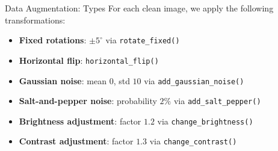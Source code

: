 \begin{frame}{Data Augmentation: Types}
  For each clean image, we apply the following transformations:
  \begin{itemize}
    \item \textbf{Fixed rotations}: $\pm5^\circ$ via \texttt{rotate\_fixed()}
    \item \textbf{Horizontal flip}: \texttt{horizontal\_flip()}
    \item \textbf{Gaussian noise}: mean $0$, std $10$ via \texttt{add\_gaussian\_noise()}
    \item \textbf{Salt-and-pepper noise}: probability $2\%$ via \texttt{add\_salt\_pepper()}
    \item \textbf{Brightness adjustment}: factor $1.2$ via \texttt{change\_brightness()}
    \item \textbf{Contrast adjustment}: factor $1.3$ via \texttt{change\_contrast()}
  \end{itemize}
\end{frame}
